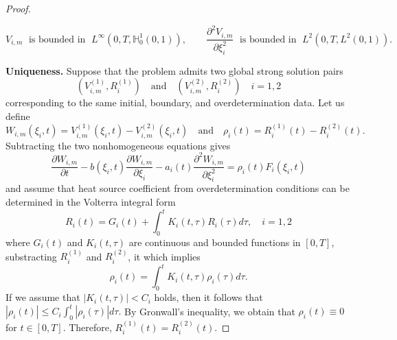 \documentclass[preprint,12pt,authoryear]{elsarticle}
\begin{document}
\begin{proof}
\begin{itemize}
        $$V_{i,m}\;\text{ is bounded in }\; L^{\infty}(0,T,\mathbb{H}_0^1(0,1)),\quad\quad \frac{\partial^2V_{i,m}}{\partial\xi_i^2}\;\text{ is bounded in }\; L^2(0,T,L^2(0,1)).$$
    \end{itemize}
    \textbf{Uniqueness.} Suppose that the problem admits two global strong solution pairs
    $$(V_{i,m}^{(1)},R_i^{(1)})\quad \text{and}\quad (V_{i,m}^{(2)},R_i^{(2)})\quad i=1,2$$
    corresponding to the same initial, boundary, and overdetermination data. Let us define
    $$W_{i,m}(\xi_i,t)=V_{i,m}^{(1)}(\xi_i,t)-V_{i,m}^{(2)}(\xi_i,t)\quad\text{and}\quad \rho_i(t)=R_i^{(1)}(t)-R_i^{(2)}(t).$$
    Subtracting the two nonhomogeneous equations gives
    \begin{equation}\label{eq63}
        \frac{\partial W_{i,m}}{\partial t}-b(\xi_i,t)\frac{\partial W_{i,m}}{\partial \xi_i}-a_i(t)\frac{\partial^2 W_{i,m}}{\partial\xi_i^2}=\rho_i(t)F_i(\xi_i,t)
    \end{equation}
    and assume that heat source coefficient from overdetermination conditions can be determined in the Volterra integral form
    $$R_i(t)=G_i(t)+\int_0^tK_i(t,\tau)R_i(\tau)d\tau,\quad i=1,2$$ 
    where $G_i(t)$ and $K_i(t,\tau)$ are continuous and bounded functions in $[0,T]$, substracting $R_i^{(1)}$ and $R_i^{(2)}$, it which implies
    \begin{equation}\label{eq64}
        \rho_i(t)=\int_0^t K_i(t,\tau)\rho_i(\tau)d\tau.
    \end{equation}
    If we assume that $|K_i(t,\tau)|<C_i$ holds, then it follows that $|\rho_i(t)|\leq C_i\int_0^t |\rho_i(\tau)|d\tau.$
    By Gronwall's inequality, we obtain that $\rho_i(t)\equiv 0$ for $t\in[0,T]$. Therefore, $R_i^{(1)}(t)=R_i^{(2)}(t)$.
    

\end{proof}
\end{document}
